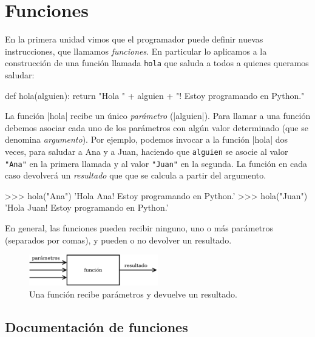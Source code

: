 \chapter[Funciones]{Funciones}
\label{chapter:funciones}

En la primera unidad vimos que el programador puede definir nuevas
instrucciones, que llamamos \emph{funciones}. En particular lo aplicamos a la
construcción de una función llamada \lstinline+hola+ que saluda a todos a
quienes queramos saludar:

\begin{codigo-python-sn}
def hola(alguien):
	return "Hola " + alguien + "! Estoy programando en Python."
\end{codigo-python-sn}

La función |hola| recibe un único \emph{parámetro} (|alguien|). Para llamar a
una función debemos asociar cada uno de los parámetros con algún valor
determinado (que se denomina \emph{argumento}). Por ejemplo, podemos invocar a
la función |hola| dos veces, para saludar a Ana y a Juan, haciendo que
\lstinline+alguien+ se asocie al valor \lstinline!"Ana"! en la primera llamada
y al valor \lstinline!"Juan"! en la segunda. La función en cada caso devolverá
un \emph{resultado} que que se calcula a partir del argumento.

\begin{codigo-python-sn}
>>> hola("Ana")
'Hola Ana! Estoy programando en Python.'
>>> hola("Juan")
'Hola Juan! Estoy programando en Python.'
\end{codigo-python-sn}

En general, las funciones pueden recibir ninguno, uno o más parámetros
(separados por comas), y pueden o no devolver un resultado.

\begin{figure}[ht]
\caption{Una función recibe parámetros y devuelve un resultado.}
\begin{center}
\includegraphics[width=0.5\textwidth]{graficos/funcion}
\end{center}
\end{figure}

\section{Documentación de funciones}

